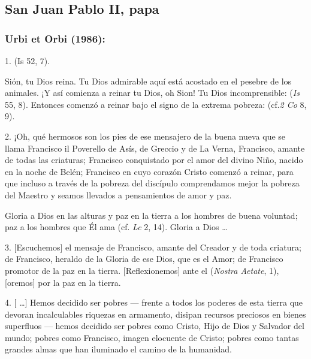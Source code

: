 \newsection

\subsection{San Juan Pablo II, papa}

\subsubsection{Urbi et Orbi (1986):}


\begin{body}
	1.  (Is 52, 7).
	
	 Sión, tu Dios reina. Tu Dios admirable aquí está acostado en el pesebre de los animales. ¡Y así comienza a reinar tu Dios, oh Sion! Tu Dios incomprensible:  (\emph{Is} 55, 8). Entonces comenzó a reinar bajo el signo de la extrema pobreza:  (cf.\emph{2 Co} 8, 9).
	
	2. ¡Oh, qué hermosos son los pies de ese mensajero de la buena nueva que se llama Francisco il Poverello de Asís, de Greccio y de La Verna, Francisco, amante de todas las criaturas; Francisco conquistado por el amor del divino Niño, nacido en la noche de Belén; Francisco en cuyo corazón Cristo comenzó a reinar, para que incluso a través de la pobreza del discípulo comprendamos mejor la pobreza del Maestro y seamos llevados a pensamientos de amor y paz.
	
	Gloria a Dios en las alturas y paz en la tierra a los hombres de buena voluntad; paz a los hombres que Él ama (cf. \emph{Lc} 2, 14). Gloria a Dios \ldots{}
	
	3. {[}Escuchemos{]} el mensaje de Francisco, amante del Creador y de toda criatura; de Francisco, heraldo de la Gloria de ese Dios, que  es el Amor; de Francisco promotor de la paz en la tierra. {[}Reflexionemos{]} ante el  ({\emph{Nostra Aetate}}, 1), {[}oremos{]} por la paz en la tierra.
	
	4. {[} \ldots{}{]} Hemos decidido ser pobres --- frente a todos los poderes de esta tierra que devoran incalculables riquezas en armamento, disipan recursos preciosos en bienes superfluos --- hemos decidido ser pobres como Cristo, Hijo de Dios y Salvador del mundo; pobres como Francisco, imagen elocuente de Cristo; pobres como tantas grandes almas que han iluminado el camino de la humanidad.
	

\end{body}
